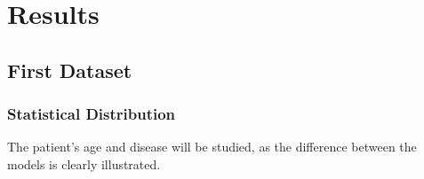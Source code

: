 
\chapter{Results}
\label{ch:results}

\section{First Dataset}


\subsection{Statistical Distribution}



The patient's age and disease will be studied, as the difference between the models is clearly illustrated.

